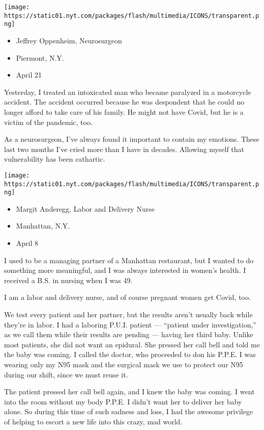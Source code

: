 \texttt{[image: https://static01.nyt.com/packages/flash/multimedia/ICONS/transparent.png]}

\begin{itemize}
\tightlist
\item
  Jeffrey Oppenheim, Neurosurgeon
\item
  Piermont, N.Y.
\item
  April 21
\end{itemize}

Yesterday, I treated an intoxicated man who became paralyzed in a
motorcycle accident. The accident occurred because he was despondent
that he could no longer afford to take care of his family. He might not
have Covid, but he is a victim of the pandemic, too.

As a neurosurgeon, I've always found it important to contain my
emotions. These last two months I've cried more than I have in decades.
Allowing myself that vulnerability has been cathartic.

\texttt{[image: https://static01.nyt.com/packages/flash/multimedia/ICONS/transparent.png]}

\begin{itemize}
\tightlist
\item
  Margit Anderegg, Labor and Delivery Nurse
\item
  Manhattan, N.Y.
\item
  April 8
\end{itemize}

I used to be a managing partner of a Manhattan restaurant, but I wanted
to do something more meaningful, and I was always interested in women's
health. I received a B.S. in nursing when I was 49.

I am a labor and delivery nurse, and of course pregnant women get Covid,
too.

We test every patient and her partner, but the results aren't usually
back while they're in labor. I had a laboring P.U.I. patient ---
``patient under investigation,'' as we call them while their results are
pending --- having her third baby. Unlike most patients, she did not
want an epidural. She pressed her call bell and told me the baby was
coming. I called the doctor, who proceeded to don his P.P.E. I was
wearing only my N95 mask and the surgical mask we use to protect our N95
during our shift, since we must reuse it.

The patient pressed her call bell again, and I knew the baby was coming.
I went into the room without my body P.P.E. I didn't want her to deliver
her baby alone. So during this time of such sadness and loss, I had the
awesome privilege of helping to escort a new life into this crazy, mad
world.


